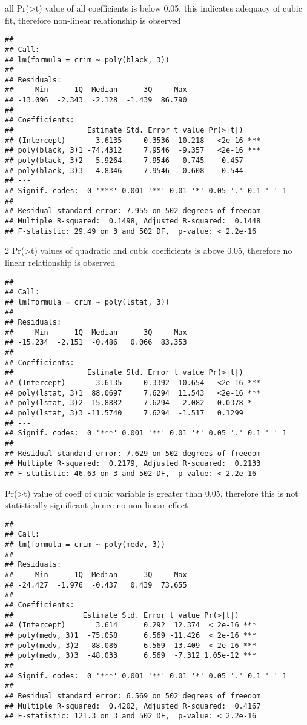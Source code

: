 \documentclass[
]{article}
\begin{document}
all Pr(\textgreater\textbar t\textbar) value of all coefficients is
below 0.05, this indicates adequacy of cubic fit, therefore non-linear
relationship is observed

\begin{verbatim}
## 
## Call:
## lm(formula = crim ~ poly(black, 3))
## 
## Residuals:
##     Min      1Q  Median      3Q     Max 
## -13.096  -2.343  -2.128  -1.439  86.790 
## 
## Coefficients:
##                 Estimate Std. Error t value Pr(>|t|)    
## (Intercept)       3.6135     0.3536  10.218   <2e-16 ***
## poly(black, 3)1 -74.4312     7.9546  -9.357   <2e-16 ***
## poly(black, 3)2   5.9264     7.9546   0.745    0.457    
## poly(black, 3)3  -4.8346     7.9546  -0.608    0.544    
## ---
## Signif. codes:  0 '***' 0.001 '**' 0.01 '*' 0.05 '.' 0.1 ' ' 1
## 
## Residual standard error: 7.955 on 502 degrees of freedom
## Multiple R-squared:  0.1498, Adjusted R-squared:  0.1448 
## F-statistic: 29.49 on 3 and 502 DF,  p-value: < 2.2e-16
\end{verbatim}

2 Pr(\textgreater\textbar t\textbar) values of quadratic and cubic
coefficients is above 0.05, therefore no linear relationship is observed

\begin{verbatim}
## 
## Call:
## lm(formula = crim ~ poly(lstat, 3))
## 
## Residuals:
##     Min      1Q  Median      3Q     Max 
## -15.234  -2.151  -0.486   0.066  83.353 
## 
## Coefficients:
##                 Estimate Std. Error t value Pr(>|t|)    
## (Intercept)       3.6135     0.3392  10.654   <2e-16 ***
## poly(lstat, 3)1  88.0697     7.6294  11.543   <2e-16 ***
## poly(lstat, 3)2  15.8882     7.6294   2.082   0.0378 *  
## poly(lstat, 3)3 -11.5740     7.6294  -1.517   0.1299    
## ---
## Signif. codes:  0 '***' 0.001 '**' 0.01 '*' 0.05 '.' 0.1 ' ' 1
## 
## Residual standard error: 7.629 on 502 degrees of freedom
## Multiple R-squared:  0.2179, Adjusted R-squared:  0.2133 
## F-statistic: 46.63 on 3 and 502 DF,  p-value: < 2.2e-16
\end{verbatim}

Pr(\textgreater\textbar t\textbar) value of coeff of cubic variable is
greater than 0.05, therefore this is not statistically significant
,hence no non-linear effect

\begin{verbatim}
## 
## Call:
## lm(formula = crim ~ poly(medv, 3))
## 
## Residuals:
##     Min      1Q  Median      3Q     Max 
## -24.427  -1.976  -0.437   0.439  73.655 
## 
## Coefficients:
##                Estimate Std. Error t value Pr(>|t|)    
## (Intercept)       3.614      0.292  12.374  < 2e-16 ***
## poly(medv, 3)1  -75.058      6.569 -11.426  < 2e-16 ***
## poly(medv, 3)2   88.086      6.569  13.409  < 2e-16 ***
## poly(medv, 3)3  -48.033      6.569  -7.312 1.05e-12 ***
## ---
## Signif. codes:  0 '***' 0.001 '**' 0.01 '*' 0.05 '.' 0.1 ' ' 1
## 
## Residual standard error: 6.569 on 502 degrees of freedom
## Multiple R-squared:  0.4202, Adjusted R-squared:  0.4167 
## F-statistic: 121.3 on 3 and 502 DF,  p-value: < 2.2e-16
\end{verbatim}
\end{document}
